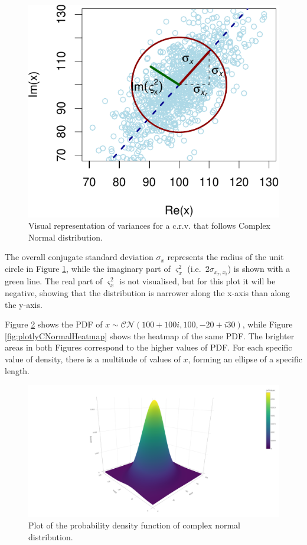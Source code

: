 \documentclass[
]{book}
\begin{document}
\begin{figure}
\centering
\includegraphics{Svetunkov---Svetunkov---Complex-Dynamic-Models_files/figure-latex/crvNormalMoments-1.pdf}
\caption{\label{fig:crvNormalMoments}Visual representation of variances for a c.r.v. that follows Complex Normal distribution.}
\end{figure}

The overall conjugate standard deviation \(\sigma_x\) represents the radius of the unit circle in Figure \ref{fig:crvNormalMoments}, while the imaginary part of \(\varsigma_x^2\) (i.e.~\(2 \sigma_{x_r, x_i}\)) is shown with a green line. The real part of \(\varsigma_x^2\) is not visualised, but for this plot it will be negative, showing that the distribution is narrower along the x-axis than along the y-axis.

Figure \ref{fig:plotlyCNormal} shows the PDF of \(x \sim \mathcal{CN}(100+100i,100,-20+i30)\), while Figure \ref{fig:plotlyCNormalHeatmap} shows the heatmap of the same PDF. The brighter areas in both Figures correspond to the higher values of PDF. For each specific value of density, there is a multitude of values of \(x\), forming an ellipse of a specific length.

\begin{figure}
\centering
\includegraphics{./images/plotlyCNormal.png}
\caption{\label{fig:plotlyCNormal}Plot of the probability density function of complex normal distribution.}
\end{figure}
\end{document}
